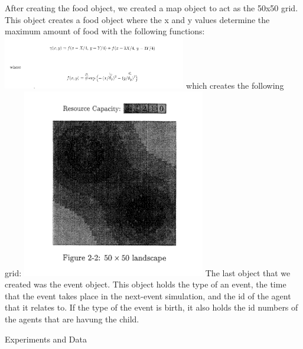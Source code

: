 \documentclass[11pt]{article}
\begin{document}
\begin{multicols}{2}
\newline
After creating the food object, we created a map object to act as the 50x50 grid. This object creates a food object where the x and y values determine the maximum amount of food with the following functions: \newline
\includegraphics[width=80mm]{MaxFoodFunction.PNG} \newline
which creates the following grid: \newline
\includegraphics[width=80mm]{ResourceCapacity.PNG} \newline
\newline
The last object that we created was the event object. This object holds the type of an event, the time that the event takes place in the next-event simulation, and the id of the agent that it relates to. If the type of the event is birth, it also holds the id numbers of the agents that are havung the child.
\newline
\newline

\center 
Experiments and Data
\flushleft


\end{multicols}
\end{document}
